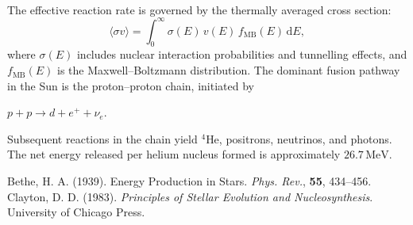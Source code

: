 \begin{technical}
    \vspace{0.2em}
    \\[0.2em]
    The effective reaction rate is governed by the thermally averaged cross section:
    \[
    \langle \sigma v \rangle = \int_0^\infty \sigma(E)\, v(E)\, f_\text{MB}(E)\, \mathrm{d}E,
    \]
    where \(\sigma(E)\) includes nuclear interaction probabilities and tunnelling effects, and \(f_\text{MB}(E)\) is the Maxwell–Boltzmann distribution. The dominant fusion pathway in the Sun is the proton–proton chain, initiated by \par
    $p + p \to d + e^+ + \nu_e.$ \par
    Subsequent reactions in the chain yield \( ^4\text{He} \), positrons, neutrinos, and photons. The net energy released per helium nucleus formed is approximately \(26.7\,\text{MeV}\).
    
    \techref
{\footnotesize
Bethe, H. A. (1939). Energy Production in Stars. \textit{Phys. Rev.}, \textbf{55}, 434–456.\\
Clayton, D. D. (1983). \textit{Principles of Stellar Evolution and Nucleosynthesis}. University of Chicago Press.
}
    \end{technical}
    